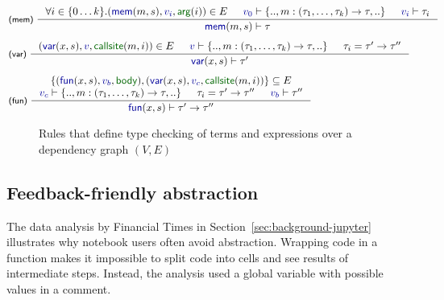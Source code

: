 \documentclass[english,submission]{programming}
\theoremstyle{plain}
\theoremstyle{definition}
\newcommand{\bndclr}[1]{\textcolor{kvdclr}{#1}}
\newcommand{\bnd}[1]{\textnormal{\textcolor{kvdclr}{\sffamily #1}}}
\newcommand{\blbl}[1]{\textnormal{\textcolor{numclr}{\sffamily #1}}}
\newcommand{\rname}[1]{{\sffamily(#1)}}
\begin{document}

\begin{figure}[b]
\vspace{-0.5em}
\begin{equation*}
\hspace{-3.5em}
\begin{array}{l}
\inference[\rname{mem}~]
  { \forall i\in\{0\ldots k\}.(\bnd{mem}(m, s), \bndclr{v_i}, \blbl{arg}(i)) \in E &
  \bndclr{v_0} \vdash \{.., m:(\tau_1, \ldots, \tau_k) \rightarrow \tau, ..\} & \bndclr{v_i} \vdash \tau_i }
  { \bnd{mem}(m, s) \vdash \tau }
\\[1.5em]
\inference[\rname{var}~]
  { (\bnd{var}(x,s), \bndclr{v}, \blbl{callsite}(m, i)) \in E &
    \bndclr{v} \vdash \{.., m:(\tau_1, \ldots, \tau_k)\rightarrow \tau,..\} & \tau_i=\tau'\rightarrow\tau'' }
  { \bnd{var}(x, s) \vdash \tau' }
\\[1.5em]
\inference[\rname{fun}~]
  { \{(\bnd{fun}(x,s), \bndclr{v_b}, \blbl{body}), (\bnd{var}(x,s), \bndclr{v_c}, \blbl{callsite}(m, i))\} \subseteq E \\
    \bndclr{v_c} \vdash \{.., m:(\tau_1, \ldots, \tau_k)\rightarrow \tau,..\} &
    \tau_i=\tau'\rightarrow\tau'' & \bndclr{v_b} \vdash \tau'' }
  { \bnd{fun}(x, s) \vdash \tau' \rightarrow \tau'' }
\end{array}
\end{equation*}
\vspace{-0.5em}
\caption{Rules that define type checking of terms and expressions over a dependency graph $(V, E)$}
\label{fig:tc}
\vspace{-0.5em}
\end{figure}


\subsection{Feedback-friendly abstraction}
\label{sec:extra-abstraction}

The data analysis by Financial Times in Section~\ref{sec:background-jupyter} illustrates why
notebook users often avoid abstraction. Wrapping code in a function makes it impossible to
split code into cells and see results of intermediate steps. Instead, the analysis used a
global variable with possible values in a comment.
\end{document}
